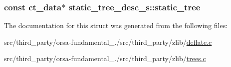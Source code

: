 \subsubsection[{static\+\_\+tree}]{\setlength{\rightskip}{0pt plus 5cm}const {\bf ct\+\_\+data}$\ast$ static\+\_\+tree\+\_\+desc\+\_\+s\+::static\+\_\+tree}\label{structstatic__tree__desc__s_a56265073858de4ffe99e32d0f9d38545}


The documentation for this struct was generated from the following files\+:\begin{DoxyCompactItemize}
\item 
src/third\+\_\+party/orsa-\/fundamental\+\_./src/third\+\_\+party/zlib/\hyperlink{deflate_8c}{deflate.\+c}\item 
src/third\+\_\+party/orsa-\/fundamental\+\_./src/third\+\_\+party/zlib/\hyperlink{trees_8c}{trees.\+c}\end{DoxyCompactItemize}
